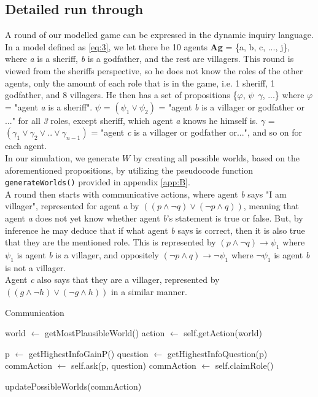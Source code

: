 \subsection{Detailed run through}\label{ARoundOfTheGame}
A round of our modelled game can be expressed in the dynamic inquiry language.
In a model defined as \cref{eq:3}, we let there be 10 agents \textbf{Ag} = \{a,
b, c, ..., j\}, where \textit{a} is a sheriff, \textit{b} is a godfather, and
the rest are villagers. This round is viewed from the sheriffs perspective, so
he does not know the roles of the other agents, only the amount of each role
that is in the game, i.e. 1 sheriff, 1 godfather, and 8 villagers. He then has
a set of propositions \{$\varphi$, $\psi$\, $\gamma$, ...\} where $\varphi$ =
"agent \textit{a} is a sheriff". $\psi$ = $(\psi_1 \lor \psi_2)$ = "agent
\textit{b} is a villager or godfather or ..." for all \textit{3} roles, except
sheriff, which agent \textit{a} knows he himself is. $\gamma$ = $(\gamma_1 \lor
	\gamma_2 \lor .. \lor \gamma_{n-1}) $ = "agent \textit{c} is a villager or
godfather or...", and so on for each agent. \\ In our simulation, we generate
$W$ by creating all possible worlds, based on the aforementioned propositions,
by utilizing the pseudocode function
\lstinline{generateWorlds()} provided in appendix \ref{app:B}. \\ A round then
starts with communicative actions, where agent \textit{b} says "I am villager",
represented for agent \textit{a} by $((p \land \neg q) \lor (\neg p \land q))$,
 meaning that agent \textit{a} does not yet know whether
agent \textit{b}'s statement is true or false. But, by inference he may deduce
that if what agent \textit{b} says is correct, then it is also true that they
are the mentioned role. This is represented by $(p \land \neg q) \rightarrow
	\psi_1$ where $\psi_1$ is agent \textit{b} is a villager, and oppositely $(\neg
	p \land q) \rightarrow \neg \psi_1$ where $\neg \psi_1$ is agent \textit{b} is
not a villager. \\ Agent \textit{c} also says that they are a villager,
represented by $((g \land \neg h) \lor (\neg g \land h))$ in a similar manner.

\begin{algorithm}
	\caption{Communication}
	\begin{algorithmic}[1]
		\State world $\gets$ getMostPlausibleWorld()
		\State action $\gets$ self.getAction(world)

		\State p $\gets$ getHighestInfoGainP()
		\State question $\gets$ getHighestInfoQuestion(p)
		\State commAction $\gets$ self.ask(p, question)
		\State commAction $\gets$ self.claimRole()
		\EndIf

		\State updatePossibleWorlds(commAction)
		\EndFunction
	\end{algorithmic}
\end{algorithm}\label{lst:communicate}

